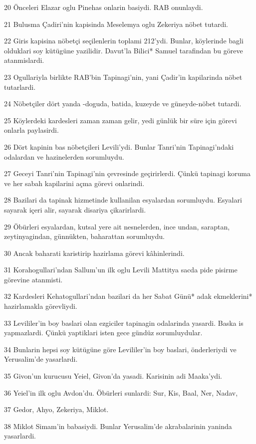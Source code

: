 \par 20 Önceleri Elazar oglu Pinehas onlarin basiydi. RAB onunlaydi.
\par 21 Bulusma Çadiri'nin kapisinda Meselemya oglu Zekeriya nöbet tutardi.
\par 22 Giris kapisina nöbetçi seçilenlerin toplami 212'ydi. Bunlar, köylerinde bagli olduklari soy kütügüne yazilidir. Davut'la Bilici* Samuel tarafindan bu göreve atanmislardi.
\par 23 Ogullariyla birlikte RAB'bin Tapinagi'nin, yani Çadir'in kapilarinda nöbet tutarlardi.
\par 24 Nöbetçiler dört yanda -doguda, batida, kuzeyde ve güneyde-nöbet tutardi.
\par 25 Köylerdeki kardesleri zaman zaman gelir, yedi günlük bir süre için görevi onlarla paylasirdi.
\par 26 Dört kapinin bas nöbetçileri Levili'ydi. Bunlar Tanri'nin Tapinagi'ndaki odalardan ve hazinelerden sorumluydu.
\par 27 Geceyi Tanri'nin Tapinagi'nin çevresinde geçirirlerdi. Çünkü tapinagi koruma ve her sabah kapilarini açma görevi onlarindi.
\par 28 Bazilari da tapinak hizmetinde kullanilan esyalardan sorumluydu. Esyalari sayarak içeri alir, sayarak disariya çikarirlardi.
\par 29 Öbürleri esyalardan, kutsal yere ait nesnelerden, ince undan, saraptan, zeytinyagindan, günnükten, baharattan sorumluydu.
\par 30 Ancak baharati karistirip hazirlama görevi kâhinlerindi.
\par 31 Korahogullari'ndan Sallum'un ilk oglu Levili Mattitya sacda pide pisirme görevine atanmisti.
\par 32 Kardesleri Kehatogullari'ndan bazilari da her Sabat Günü* adak ekmeklerini* hazirlamakla görevliydi.
\par 33 Levililer'in boy baslari olan ezgiciler tapinagin odalarinda yasardi. Baska is yapmazlardi. Çünkü yaptiklari isten gece gündüz sorumluydular.
\par 34 Bunlarin hepsi soy kütügüne göre Levililer'in boy baslari, önderleriydi ve Yerusalim'de yasarlardi.
\par 35 Givon'un kurucusu Yeiel, Givon'da yasadi. Karisinin adi Maaka'ydi.
\par 36 Yeiel'in ilk oglu Avdon'du. Öbürleri sunlardi: Sur, Kis, Baal, Ner, Nadav,
\par 37 Gedor, Ahyo, Zekeriya, Miklot.
\par 38 Miklot Simam'in babasiydi. Bunlar Yerusalim'de akrabalarinin yaninda yasarlardi.
